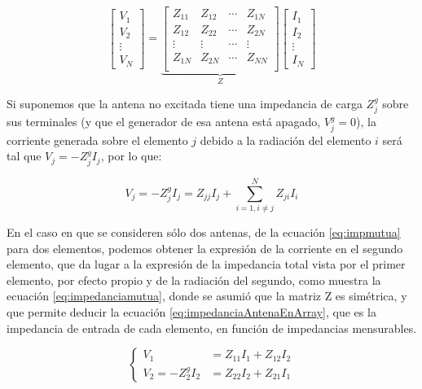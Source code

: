 \begin{equation} \label{eq:Matriz_impedancias_mutuas}
\begin{bmatrix}
V_1 \\ V_2 \\ \vdots \\ V_N
\end{bmatrix}
=
\underbrace{\begin{bmatrix}
	Z_{11} & Z_{12} & \cdots & Z_{1N} \\
	Z_{12} & Z_{22} & \cdots & Z_{2N} \\
	\vdots & \vdots & \cdots & \vdots \\
	Z_{1N} & Z_{2N} & \cdots & Z_{NN} \\
	\end{bmatrix}}_{Z}
\begin{bmatrix}
I_1 \\ I_2 \\ \vdots \\ I_N
\end{bmatrix}
\end{equation}

Si suponemos que la antena no excitada tiene una impedancia de carga $Z^g_j$ sobre sus terminales (y que el generador de esa antena está apagado, $V^g_j=0$), la corriente generada sobre el elemento $j$ debido a la radiación del elemento $i$ será tal que $V_j=-Z^g_j I_j$, por lo que:

\begin{equation} \label{eq:impmutua}
V_j = -Z^g_j I_j = Z_{jj}I_j + \sum_{i=1, i \neq j}^{N} Z_{ji}I_i 
\end{equation}

En el caso en que se consideren sólo dos antenas, de la ecuación \ref{eq:impmutua} para dos elementos, podemos obtener la expresión de la corriente en el segundo elemento, que da lugar a la expresión de la impedancia total vista por el primer elemento, por efecto propio y de la radiación del segundo, como muestra la ecuación \ref{eq:impedanciamutua}, donde se asumió que la matriz Z es simétrica, y que permite deducir la ecuación \ref{eq:impedanciaAntenaEnArray}, que es la impedancia de entrada de cada elemento, en función de impedancias mensurables.

\begin{equation}
	\label{eq:impedanciamutua}
	\left\{
	\begin{aligned}
		V_1 &= Z_{11} I_1 + Z_{12} I_2 \\
		V_2 = -Z^g_2 I_2 &= Z_{22} I_2 + Z_{21}I_1
	\end{aligned}
	\right.
\end{equation}

